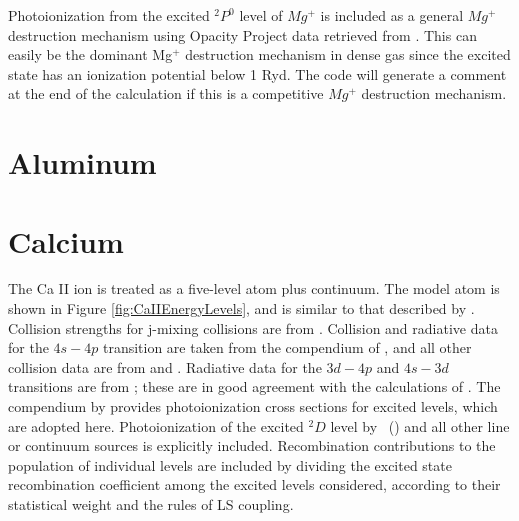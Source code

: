 Photoionization from the excited $^2P^0$ level of $Mg^+$ is included as a general
$Mg^+$ destruction mechanism using Opacity Project data retrieved from
.
This can easily be the dominant Mg$^+$ destruction mechanism in
dense gas
since the excited state has an ionization potential below 1 Ryd.  The code
will generate a comment at the end of the calculation if this is a
competitive $Mg^+$ destruction mechanism.

\section{Aluminum}


\section{Calcium}

The Ca II ion is treated as a five-level atom plus continuum.  The model
atom is shown in Figure \ref{fig:CaIIEnergyLevels}, and is similar to that described by \citet{Shine1974}.  Collision strengths for j-mixing collisions are from \citet{Saraph1970}.  Collision and radiative data for the $4s - 4p$ transition are taken
from the compendium of \citet{Mendoza1983}, and all other collision data are
from \citet{Chidichimo1981} and \citet{Saraph1970}.  Radiative data for the $3d - 4p$
and $4s - 3d$ transitions are from
\citet{BlackWeisheit1972}; these
are in good agreement with the calculations of \citet{Osterbrock1951}.  The
compendium by \citet{Shine1974} provides photoionization cross sections
for excited levels, which are adopted here.  Photoionization of the excited
$^2D$ level by \la\ (\citealp{Wyse1941}) and all other line or continuum sources is
explicitly included.  Recombination contributions to the population of
individual levels are included by dividing the excited state recombination
coefficient among the excited levels considered, according to their
statistical weight and the rules of LS coupling.

